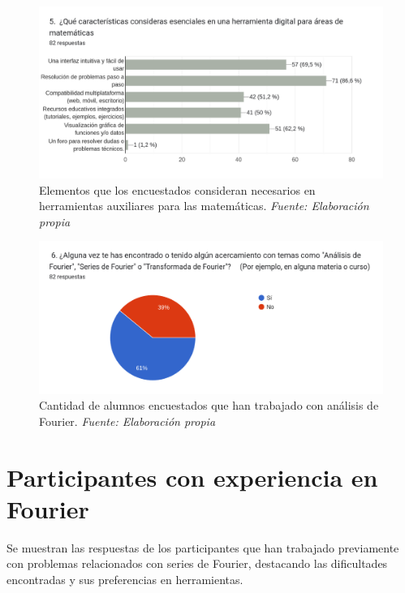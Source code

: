 \begin{figure}[H]
	\centering
	\includegraphics[width=1\textwidth]{img/appendixA/5_caracteristicas_para_app_mates.png}
	\caption[Elementos que los encuestados consideran necesarios en herramientas auxiliares para las matemáticas.]{Elementos que los encuestados consideran necesarios en herramientas auxiliares para las matemáticas. \textit{Fuente: Elaboración propia}}
	\label{fig:app1_software_para_mates}  %
\end{figure}


\begin{figure}[H]
	\centering
	\includegraphics[width=1\textwidth]{img/appendixA/6_Fourier_Filtro.png}
	\caption[Cantidad de alumnos encuestados que han trabajado con análisis de Fourier.]{Cantidad de alumnos encuestados que han trabajado con análisis de Fourier. \textit{Fuente: Elaboración propia}}
	\label{fig:app1_Fourier_Filtro}  %
\end{figure}

\newpage
\section{Participantes con experiencia en Fourier}
Se muestran las respuestas de los participantes que han trabajado previamente con problemas relacionados con series de Fourier, destacando las dificultades encontradas y sus preferencias en herramientas.

